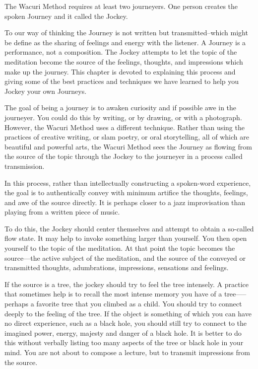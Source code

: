\documentclass[12pt]{book}
\begin{document}
The Wacuri Method requires at least two journeyers. One person creates the spoken Journey and it called the Jockey.
					
To our way of thinking the Journey is not written but transmitted--which might be define as the sharing of feelings and energy with the listener. A Journey is a performance, not a composition. The Jockey attempts to let the topic of the meditation become the source of the feelings, thoughts, and impressions which make up the journey. This chapter is devoted to explaining this process and giving some of the best practices and techniques we have learned to help you Jockey your own Journeys.
					
The goal of being a journey is to awaken curiosity and if possible awe in the journeyer. You could do this by writing, or by drawing, or with a photograph. However, the Wacuri Method uses a different technique. Rather than using the practices of creative writing, or slam poetry, or oral storytelling, all of which are beautiful and powerful arts, the Wacuri Method sees the Journey as flowing from the source of the topic through the Jockey to the journeyer in a process called transmission.
					
In this process, rather than intellectually constructing a spoken-word experience, the goal is to authentically convey with minimum artifice the thoughts, feelings, and awe of the source directly. It is perhaps closer to a jazz improvisation than playing from a written piece of music.
					
To do this, the Jockey should center themselves and attempt to obtain a so-called flow state. It may help to invoke something larger than yourself. You then open yourself to the topic of the meditation. At that point the topic becomes the source—the active subject of the meditation, and the source of the conveyed or transmitted thoughts, adumbrations, impressions, sensations and feelings.
					
If the source is a tree, the jockey should try to feel the tree intensely. A practice that sometimes help is to recall the most intense memory you have of a tree—--perhaps a favorite tree that you climbed as a child. You should try to connect deeply  to the feeling of the tree. If the object is something of which you can have no direct experience, such as a black hole, you should still try to connect to the imagined power, energy, majesty and danger of a black hole. It is better to do this without verbally listing too many aspects of the tree or black hole in your mind. You are not about to compose a lecture, but to transmit impressions from the source.
					
\end{document}

